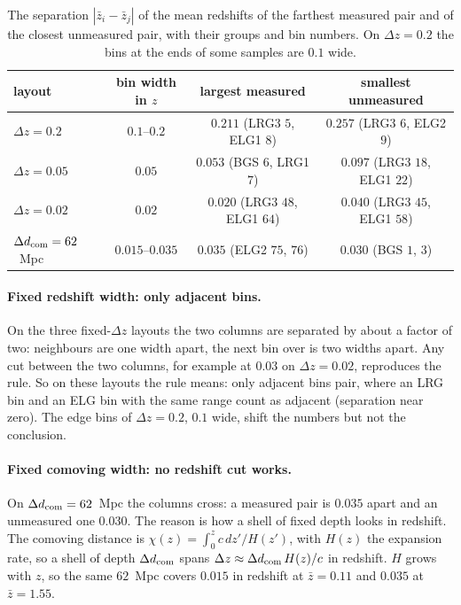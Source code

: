 \documentclass[11pt]{article}
\newcommand{\dcom}{$\Delta d_{\rm com} = 62$~Mpc}
\begin{document}
\begin{table}[ht]
  \centering
  \small
  \begin{tabular}{lccc}
    \hline
    layout & bin width in $z$ & largest measured & smallest unmeasured \\
    \hline
    $\Delta z = 0.2$ & $0.1$--$0.2$ & $0.211$ (LRG3 $5$, ELG1 $8$)
      & $0.257$ (LRG3 $6$, ELG2 $9$) \\
    $\Delta z = 0.05$ & $0.05$ & $0.053$ (BGS $6$, LRG1 $7$)
      & $0.097$ (LRG3 $18$, ELG1 $22$) \\
    $\Delta z = 0.02$ & $0.02$ & $0.020$ (LRG3 $48$, ELG1 $64$)
      & $0.040$ (LRG3 $45$, ELG1 $58$) \\
    \dcom{} & $0.015$--$0.035$ & $0.035$ (ELG2 $75$, $76$)
      & $0.030$ (BGS $1$, $3$) \\
    \hline
  \end{tabular}
  \caption{The separation $|\bar{z}_i - \bar{z}_j|$ of the mean
    redshifts of the farthest measured pair and of the closest
    unmeasured pair, with their groups and bin numbers.  On
    $\Delta z = 0.2$ the bins at the ends of some samples are $0.1$
    wide.}
  \label{tab:separations}
\end{table}

\paragraph{Fixed redshift width: only adjacent bins.}
On the three fixed-$\Delta z$ layouts the two columns are separated by
about a factor of two: neighbours are one width apart, the next bin
over is two widths apart.  Any cut between the two columns, for
example at $0.03$ on $\Delta z = 0.02$, reproduces the rule.  So on
these layouts the rule means: only adjacent bins pair,
where an LRG bin and an ELG bin with the same range count as adjacent
(separation near zero).  The edge bins of $\Delta z = 0.2$, $0.1$
wide, shift the numbers but not the conclusion.

\paragraph{Fixed comoving width: no redshift cut works.}
On \dcom{} the columns cross: a measured pair is $0.035$ apart and an
unmeasured one $0.030$.  The reason is how a shell of fixed depth
looks in redshift.  The comoving distance is $\chi(z) = \int_0^z c\,
dz'/H(z')$, with $H(z)$ the expansion rate, so a shell of depth
$\Delta d_{\rm com}$ spans $\Delta z \approx \Delta d_{\rm com}\,
H(z)/c$ in redshift.  $H$ grows with $z$, so the same $62$~Mpc covers
$0.015$ in redshift at $\bar{z} = 0.11$ and $0.035$ at
$\bar{z} = 1.55$.
\end{document}
